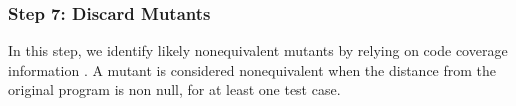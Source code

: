 {\subsubsection{Step 7: Discard Mutants}
\label{sec:algostepSeven}
%
%
In this step, we identify likely nonequivalent mutants by relying on code coverage information .
%
%
A mutant is considered nonequivalent when the distance from the original program is non null, for at least one test case.
%
%
%
%
%
}

